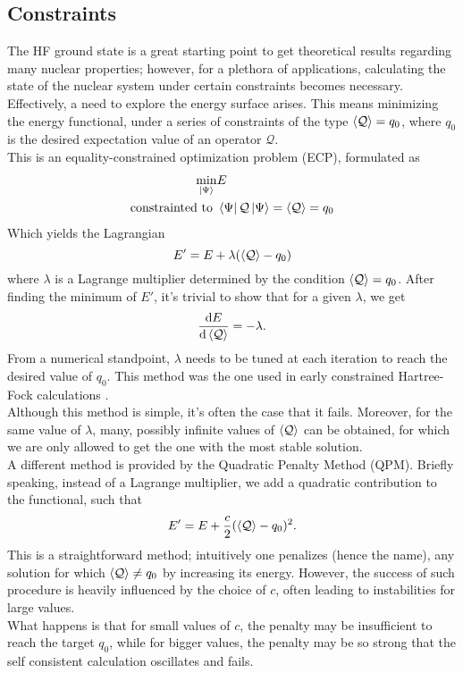 \subsection{Constraints}
The HF ground state is a great starting point to get theoretical results regarding many nuclear properties; however, for a plethora of applications, calculating the state of the nuclear system under certain constraints becomes necessary.
\\Effectively, a need to explore the energy surface arises. This means minimizing the energy functional, under a series of constraints of the type $\expval{ {\mathcal Q}}=q_0$, where $q_0$ is the desired expectation value of an operator ${\mathcal Q}$.
\\This is an equality-constrained optimization problem (ECP), formulated as
\begin{align}
\min_{\ket \Psi}&E 
\\\text{constrainted to } &\bra{\Psi} {\mathcal Q} \ket {\Psi} = \expval{ {\mathcal Q}} = q_0
\end{align}
Which yields the Lagrangian
\begin{equation}
    \label{eq:constr_lagrangian}
    E' = E + \lambda (\expval{{\mathcal Q}}-q_0)
\end{equation}
where $\lambda$ is a Lagrange multiplier determined by the condition $\expval {{\mathcal Q}} = q_0$. 
After finding the minimum of $E'$, it's trivial to show that for a given $\lambda$, we get \cite{FLOCARD1973433}
\begin{equation}
\dv{E}{\expval{{\mathcal Q}}} = -\lambda. 
\end{equation}
From a numerical standpoint, $\lambda$ needs to be tuned at each iteration to reach the desired value of $q_0$. 
This method was the one used in early constrained Hartree-Fock calculations \cite{Cusson1985}.
\\Although this method is simple, it's often the case that it fails. Moreover, for the same value of $\lambda$, many, possibly infinite values of $\expval{{\mathcal Q}}$ can be obtained, for which we are only allowed to get the one with the most stable solution.
\\A different method is provided by the Quadratic Penalty Method (QPM). Briefly speaking, instead of a Lagrange multiplier, we add a quadratic contribution to the functional, such that
\begin{equation}
    \label{eq:constr_quadratic}
    E' = E + \frac c 2 (\expval{{\mathcal Q}}-q_0)^2.
\end{equation}
This is a straightforward method; intuitively one penalizes (hence the name), any solution for which $\expval{{\mathcal Q}}\neq q_0$ by increasing its energy. However, the success of such procedure is heavily influenced by the choice of $c$, often leading to instabilities for large values.
\\What happens is that for small values of $c$, the penalty may be insufficient to reach the target $q_0$, while for bigger values, the penalty may be so strong that the self consistent calculation oscillates and fails.
